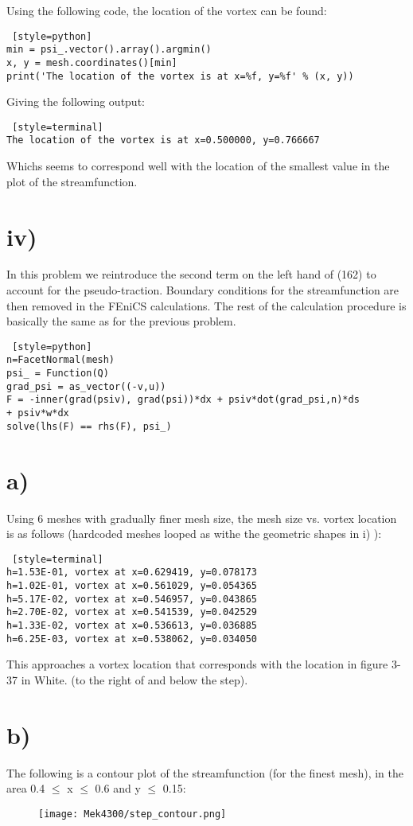 \documentclass[a4paper,english,11pt,twoside]{article}
\begin{document}
Using the following code, the location of the vortex can be found:
\begin{lstlisting} [style=python]
min = psi_.vector().array().argmin()
x, y = mesh.coordinates()[min]
print('The location of the vortex is at x=%f, y=%f' % (x, y))
\end{lstlisting}
Giving the following output:
\begin{lstlisting} [style=terminal]
The location of the vortex is at x=0.500000, y=0.766667
\end{lstlisting}
Whichs seems to correspond well with the location of the smallest value in the plot of the streamfunction.

\newpage
\section*{iv)}
In this problem we reintroduce the second term on the left hand of (162) to account for the pseudo-traction. Boundary conditions for the streamfunction are then removed in the FEniCS calculations. The rest of the calculation procedure is basically the same as for the previous problem.\\
\begin{lstlisting} [style=python]
n=FacetNormal(mesh)
psi_ = Function(Q)
grad_psi = as_vector((-v,u))
F = -inner(grad(psiv), grad(psi))*dx + psiv*dot(grad_psi,n)*ds 
+ psiv*w*dx
solve(lhs(F) == rhs(F), psi_)
\end{lstlisting}

\section*{a)}
Using 6 meshes with gradually finer mesh size, the mesh size vs. vortex location is as follows (hardcoded meshes looped as withe the geometric shapes in i) ):
\begin{lstlisting} [style=terminal]
h=1.53E-01, vortex at x=0.629419, y=0.078173
h=1.02E-01, vortex at x=0.561029, y=0.054365
h=5.17E-02, vortex at x=0.546957, y=0.043865
h=2.70E-02, vortex at x=0.541539, y=0.042529
h=1.33E-02, vortex at x=0.536613, y=0.036885
h=6.25E-03, vortex at x=0.538062, y=0.034050
\end{lstlisting}
This approaches a vortex location that corresponds with the location in figure 3-37 in White. (to the right of and below the step).
\newpage
\section*{b)}
The following is a contour plot of the streamfunction (for the finest mesh), in the area 0.4 $\leq$ x $\leq$ 0.6 and y $\leq$ 0.15:\\
\begin{figure}[h!]
\texttt{[image: Mek4300/step\_contour.png]}
\end{figure}
\end{document}
